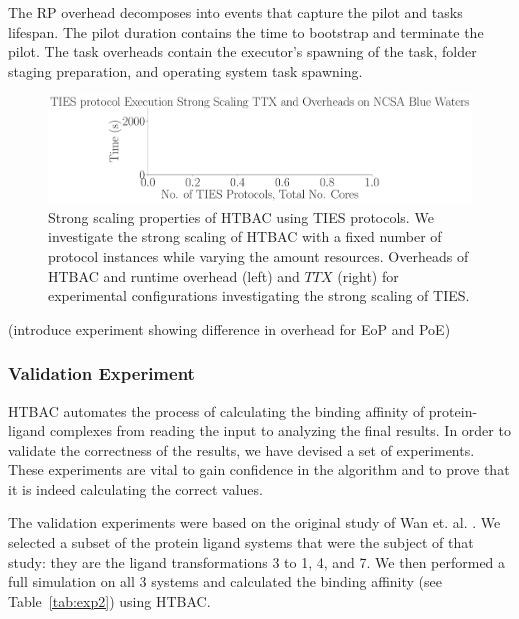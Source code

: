 The RP overhead decomposes  into events  that
capture the pilot and tasks lifespan. The pilot duration contains the time to
bootstrap and terminate the pilot. The task overheads contain the executor's
spawning of the task, folder staging preparation, and operating system task
spawning. 

\begin{figure}
  \centering
    \includegraphics[width=\columnwidth]{figures/ties_ss_pseudo.pdf}
    \caption{Strong scaling properties of HTBAC using TIES protocols. We
    investigate the strong scaling of HTBAC with a fixed number of protocol
    instances while varying the amount resources. Overheads of HTBAC and
    runtime overhead (left) and \(TTX\) (right) for experimental
    configurations investigating the strong scaling of TIES.}
\label{fig:strong_scaling_TIES}
\end{figure}


(introduce experiment showing difference in overhead for EoP and PoE)


\subsubsection{Validation Experiment}


HTBAC automates the process of calculating the binding affinity of
protein-ligand complexes from reading the input to analyzing the final
results. In order to validate the correctness of the results, we have devised
a set of experiments. These experiments are vital to gain confidence in the
algorithm and to prove that it is indeed calculating the correct values.

The validation experiments were based on the original study of Wan et. al.
\cite{Wan2017brd4}. We selected a subset of the protein ligand systems that
were the subject of that study: they are the ligand transformations 3 to 1,
4, and 7. We then performed a full simulation on all 3 systems and calculated
the binding affinity (see Table~\ref{tab:exp2}) using HTBAC.

